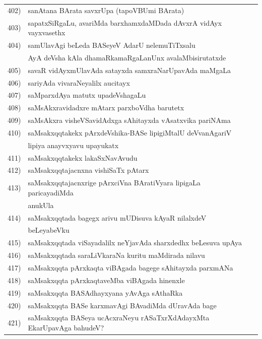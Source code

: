 {\begin{longtable}{@{}cp{7.4cm}r}
402) & sanAtana BArata savxrUpa (tapoVBUmi BArata) & \pageref{page103}\\
403) & sapatxSiRgaLu, avariMda barxhamxdaMDada dAvxrA vidAyx vayxvasethx & \pageref{page92}\\
404) & samUlavAgi beLeda BASeyeV AdarU nelemuTiTxsalu & \\
     & AyA deVsha kAla dhamaRkamaRgaLanUnx avalaMbisirutatxde & \pageref{page196}\\
405) & savaR vidAyxmUlavAda satayxda samxraNarUpavAda maMgaLa & \pageref{20e}\\
406) & sariyAda vivaraNeyalilx aucitayx & \pageref{page117}\\
407) & saMparxdAya matutx upadeVshagaLu & \pageref{page105}\\
408) & saMsAkxravidadxre mAtarx parxboVdha barutetx & \pageref{page124}\\
409) & saMsAkxra visheVSavidAdxga sAhitayxda vAsatxvika pariNAma & \pageref{page213}\\
410) & saMsakxqqtakekx pArxdeVshika-BASe lipigiMtalU deVvanAgariV & \\
     & lipiya anayvxyavu upayukatx & \pageref{page33f}\\
411) & saMsakxqqtakekx lakaSxNavAvudu & \pageref{page2}\\
412) & saMsakxqqtajacnxna vishiSaTx pAtarx & \pageref{page30a}\\
413) & saMsakxqqtajacnxrige pArxciVna BAratiVyara lipigaLa paricayadiMda & \\
     & anukUla & \pageref{page52}\\
414) & saMsakxqqtada bagegx arivu mUDisuva kAyaR nilalxdeV& \\
     & beLeyabeVku &\pageref{page21a}\\
415) & saMsakxqqtada viSayadalilx neYjavAda sharxdedhx beLesuva upAya & \pageref{page31b}\\
416) & saMsakxqqtada saraLiVkaraNa kuritu maMdirada nilavu & \pageref{page35}\\
417) & saMsakxqqta pArxkaqta viBAgada bagege sAhitayxda parxmANa & \pageref{page12a}\\
418) & saMsakxqqta pArxkaqtaveMba viBAgada hinenxle & \pageref{page11}\\
419) & saMsakxqqta BASAdhayxyana yAvAga sAthaRka & \pageref{page27}\\
420) & saMsakxqqta BASe karxmavAgi BAvadiMda dUravAda bage & \pageref{page15}\\
421) & saMsakxqqta BASeya ucAcxraNeyu rASaTxrXdAdayxMta EkarUpavAga bahudeV? & \pageref{page33a}\\

\end{longtable}}
